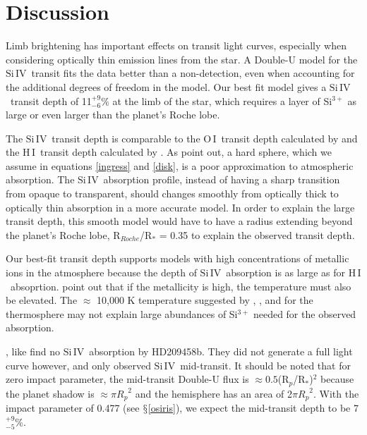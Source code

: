 \documentclass[manuscript]{aastex}
\newcommand{\oi}{\ensuremath{\mathrm{O}\,\scriptstyle \mathrm{I}}}
\newcommand{\hi}{\ensuremath{\mathrm{H}\,\scriptstyle \mathrm{I}}}
\newcommand{\siIV}{\ensuremath{\mathrm{Si}\,\scriptstyle \mathrm{IV}}}
\newcommand{\p}{R$_p$/R$_*$}
\newcommand{\lya}{Lyman-$\alpha$}
\begin{document}
\section{Discussion} \label{discuss}

Limb brightening has important effects on transit light curves, especially when considering optically thin emission lines from the star. A Double-U model for the \siIV\ transit fits the data better than a non-detection, even when accounting for the additional degrees of freedom in the model. Our best fit model gives a \siIV\ transit depth of 11$^{+9}_{-6}$\% at the limb  of the star, which requires a layer of Si$^{3+}$ as large or even larger than the planet's Roche lobe.

The \siIV\ transit depth is comparable to the \oi\ transit depth calculated by \citet{vidmad} and the \hi\ transit depth calculated by \citet{benjaf7}. As \citet{kosk} point out, a hard sphere, which we assume in equations \ref{ingress} and \ref{disk}, is a poor approximation to atmospheric absorption. The \siIV\ absorption profile, instead of having a sharp transition from opaque to transparent, should changes smoothly from optically thick to optically thin absorption in a more accurate model. In order to explain the large transit depth, this smooth model would have to have a radius extending beyond the planet's Roche lobe, R$_{Roche}$/R$_*$ = 0.35 \citep{ben10} to explain the observed transit depth.

Our best-fit transit depth supports models with high concentrations of metallic ions in the atmosphere because the depth of \siIV\ absorption is as large as for \hi\ absoprtion. \citet{kosk} point out that if the metallicity is high, the temperature must also be elevated. The $\approx$ 10,000 K temperature suggested by \citet{gmunoz}, \citet{mclay}, and \citet{kosk} for the thermosphere may not explain large abundances of Si$^{3+}$ needed for the observed absorption. 


\citet{linsky}, like \citet{vidmad} find no \siIV\ absorption by HD209458b. They did not generate a full light curve however, and only observed \siIV\ mid-transit. It should be noted that for zero impact parameter, the mid-transit Double-U flux is $\approx 0.5 $(\p)$^2$ because the planet shadow is $\approx \pi {R_p}^2$ and the hemisphere has an area of 2$\pi {R_p}^2$. With the impact parameter of 0.477 (see $\mathsection$\ref{osiris}), we expect the mid-transit depth to be  7$^{+9}_{-5}$\%. 
\end{document}
